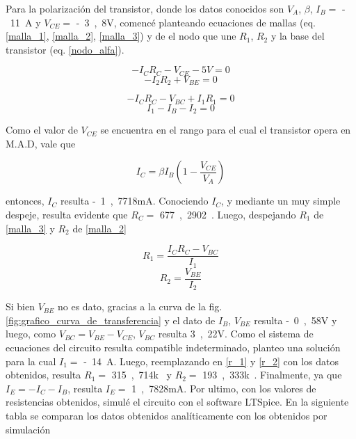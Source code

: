 \documentclass[10pt]{article}
\begin{document}
\quad Para la polarización del transistor, donde los datos conocidos son $V_A$, $\beta$, $I_B=$ \si{-11\mu}{A} y $V_{CE}=$ \si{-3,8}{V}, comencé planteando ecuaciones de mallas (eq. \ref{malla_1}, \ref{malla_2}, \ref{malla_3}) y de el nodo que une $R_1$, $R_2$ y la base del transistor (eq. \ref{nodo_alfa}).

\begin{multicols}{2}
  \noindent\begin{equation}
  \label{malla_1}
    -I_C R_C - V_{CE} -\si{5}{V} = 0
  \end{equation}
  \begin{equation}
  \label{malla_2}
    -I_2 R_2 + V_{BE} = 0
  \end{equation}
\end{multicols}
\begin{multicols}{2}
  \noindent\begin{equation}
  \label{malla_3}
    -I_C R_C - V_{BC} +I_1 R_1 = 0
  \end{equation}
  \begin{equation}
  \label{nodo_alfa}
    I_1-I_B-I_2 = 0
  \end{equation}
\end{multicols}

\quad Como el valor de $V_{CE}$ se encuentra en el rango para el cual el transistor opera en M.A.D, vale que 

\begin{equation}
    I_C = \beta I_B \left(1-\frac{V_{CE}}{V_A}\right)
\end{equation}

 entonces, $I_C$ resulta \si{-1,7718}{mA}. Conociendo $I_C$, y mediante un muy simple despeje, resulta evidente que $R_C=$ \si{677,2902\Omega}. Luego, despejando $R_1$ de \ref{malla_3} y $R_2$ de \ref{malla_2}
 
\begin{multicols}{2}
  \noindent\begin{equation}
  \label{r_1}
    R_1 = \frac{I_C R_C - V_{BC}}{I_1}
  \end{equation}
  \begin{equation}
  \label{r_2}
    R_2 = \frac{V_{BE}}{I_2}
  \end{equation}
\end{multicols}

\quad Si bien $V_{BE}$ no es dato, gracias a la curva de la fig. \ref{fig:grafico_curva_de_transferencia} y el dato de $I_B$, $V_{BE}$ resulta \si{-0,58}{V} y luego, como $V_{BC} = V_{BE}-V_{CE}$, $V_{BC}$ resulta \si{3,22}{V}. Como el sistema de ecuaciones del circuito resulta compatible indeterminado, planteo una solución para la cual $I_1 = $ \si{-14\mu}{A}. Luego, reemplazando en \ref{r_1} y \ref{r_2} con los datos obtenidos, resulta $R_1 = $ \si{315,714k\Omega} y $R_2 = $ \si{193,333k\Omega}. Finalmente, ya que $I_E = -I_C -I_B$, resulta $I_E = $ \si{1,7828m}{A}.
\quad Por ultimo, con los valores de resistencias obtenidos, simulé el circuito con el software LTSpice. En la siguiente tabla se comparan los datos obtenidos analíticamente con los obtenidos por simulación
\end{document}
